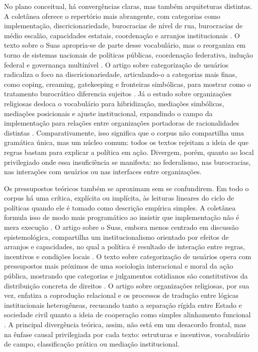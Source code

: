 \documentclass[12pt,a4paper]{article}
\begin{document}
No plano conceitual, há convergências claras, mas também arquiteturas distintas. A coletânea oferece o repertório mais abrangente, com categorias como implementação, discricionariedade, burocracias de nível de rua, burocracias de médio escalão, capacidades estatais, coordenação e arranjos institucionais \parencite{lotta2019_teorias_analises}. O texto sobre o Suas apropria-se de parte desse vocabulário, mas o reorganiza em torno de sistemas nacionais de políticas públicas, coordenação federativa, indução federal e governança multinível \parencite{bichir2020_sistemas_nacionais}. O artigo sobre categorização de usuários radicaliza o foco na discricionariedade, articulando-o a categorias mais finas, como coping, creaming, gatekeeping e fronteiras simbólicas, para mostrar como o tratamento burocrático diferencia sujeitos \parencite{lotta2020_categorizando_usuarios}. Já o estudo sobre organizações religiosas desloca o vocabulário para hibridização, mediações simbólicas, mediações posicionais e ajuste institucional, expandindo o campo da implementação para relações entre organizações portadoras de racionalidades distintas \parencite{lotta2023_jesus_speaks}. Comparativamente, isso significa que o corpus não compartilha uma gramática única, mas um núcleo comum: todos os textos rejeitam a ideia de que regras bastam para explicar a política em ação. Divergem, porém, quanto ao local privilegiado onde essa insuficiência se manifesta: no federalismo, nas burocracias, nas interações com usuários ou nas interfaces entre organizações.

Os pressupostos teóricos também se aproximam sem se confundirem. Em todo o corpus há uma crítica, explícita ou implícita, às leituras lineares do ciclo de políticas quando ele é tomado como descrição empírica simples. A coletânea formula isso de modo mais programático ao insistir que implementação não é mera execução \parencite{lotta2019_teorias_analises}. O artigo sobre o Suas, embora menos centrado em discussão epistemológica, compartilha um institucionalismo orientado por efeitos de arranjos e capacidades, no qual a política é resultado de interação entre regras, incentivos e condições locais \parencite{bichir2020_sistemas_nacionais}. O texto sobre categorização de usuários opera com pressupostos mais próximos de uma sociologia interacional e moral da ação pública, mostrando que categorias e julgamentos cotidianos são constitutivos da distribuição concreta de direitos \parencite{lotta2020_categorizando_usuarios}. O artigo sobre organizações religiosas, por sua vez, enfatiza a coprodução relacional e os processos de tradução entre lógicas institucionais heterogêneas, recusando tanto a separação rígida entre Estado e sociedade civil quanto a ideia de cooperação como simples alinhamento funcional \parencite{lotta2023_jesus_speaks}. A principal divergência teórica, assim, não está em um desacordo frontal, mas na ênfase causal privilegiada por cada texto: estruturas e incentivos, vocabulário de campo, classificação prática ou mediação institucional.
\end{document}
